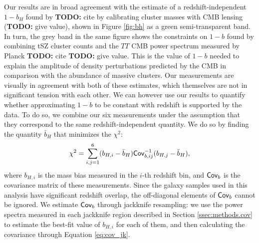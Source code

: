 \documentclass[useAMS,usenatbib]{mn2e}
\newcommand{\todo}[1]{{\bf TODO:} #1}
\begin{document}
      Our results are in broad agreement with the estimate of a redshift-independent $1-b_H$ found by \todo{cite} by calibrating cluster masses with CMB lensing (\todo{give value}), shown in Figure \ref{fig:bh} as a green semi-transparent band. In turn, the grey band in the same figure shows the constraints on $1-b$ found by combining tSZ cluster counts and the $TT$ CMB power spectrum measured by Planck \todo{cite} \todo{give value}. This is the value of $1-b$ needed to explain the amplitude of density perturbations predicted by the CMB in comparison with the abundance of massive clusters. Our measurements are visually in agreement with both of these estimates, which themselves are not in significant tension with each other. We can however use our results to quantify whether approximating $1-b$ to be constant with redshift is supported by the data. To do so, we combine our six measurements under the assumption that they correspond to the same redshift-independent quantity. We do so by finding the quantity $\bar{b}_H$ that minimizes the $\chi^2$:
      \begin{equation}
        \chi^2=\sum_{i,j=1}^6 (b_{H,i}-\bar{b}_H){\sf Cov}^{-1}_{b,ij}(b_{H,j}-\bar{b}_H),
      \end{equation}
      where $b_{H,i}$ is the mass bias measured in the $i$-th redshift bin, and ${\sf Cov}_b$ is the covariance matrix of these measurements. Since the galaxy samples used in this analysis have significant redshift overlap, the off-diagonal elements of ${\sf Cov}_b$ cannot be ignored. We estimate ${\sf Cov}_b$ through jackknife resampling: we use the power spectra measured in each jackknife region described in Section \ref{ssec:methods.cov} to estimate the best-fit value of $b_{H,i}$ for each of them, and then calculating the covariance through Equation \ref{eq:cov_jk}.
\end{document}
